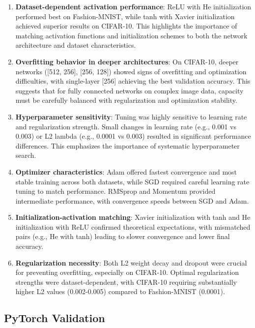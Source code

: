 \begin{enumerate}
\item \textbf{Dataset-dependent activation performance}: ReLU with He initialization performed best on Fashion-MNIST, while tanh with Xavier initialization achieved superior results on CIFAR-10. This highlights the importance of matching activation functions and initialization schemes to both the network architecture and dataset characteristics.

\item \textbf{Overfitting behavior in deeper architectures}: On CIFAR-10, deeper networks ([512, 256], [256, 128]) showed signs of overfitting and optimization difficulties, with single-layer [256] achieving the best validation accuracy. This suggests that for fully connected networks on complex image data, capacity must be carefully balanced with regularization and optimization stability.

\item \textbf{Hyperparameter sensitivity}: Tuning was highly sensitive to learning rate and regularization strength. Small changes in learning rate (e.g., 0.001 vs 0.003) or L2 lambda (e.g., 0.0001 vs 0.003) resulted in significant performance differences. This emphasizes the importance of systematic hyperparameter search.

\item \textbf{Optimizer characteristics}: Adam offered fastest convergence and most stable training across both datasets, while SGD required careful learning rate tuning to match performance. RMSprop and Momentum provided intermediate performance, with convergence speeds between SGD and Adam.

\item \textbf{Initialization-activation matching}: Xavier initialization with tanh and He initialization with ReLU confirmed theoretical expectations, with mismatched pairs (e.g., He with tanh) leading to slower convergence and lower final accuracy.

\item \textbf{Regularization necessity}: Both L2 weight decay and dropout were crucial for preventing overfitting, especially on CIFAR-10. Optimal regularization strengths were dataset-dependent, with CIFAR-10 requiring substantially higher L2 values (0.002-0.005) compared to Fashion-MNIST (0.0001).
\end{enumerate}

\subsection{PyTorch Validation}


